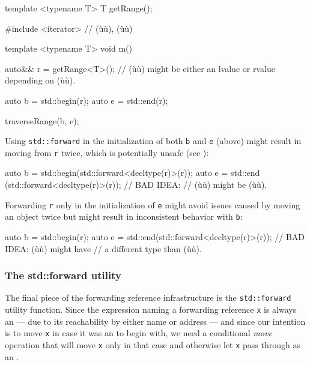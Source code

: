 \begin{emcppshiddenlisting}[emcppsbatch=e6]
template <typename T>
T getRange();
\end{emcppshiddenlisting}
\begin{emcppslisting}[emcppsbatch=e6]
#include <iterator>  // (ù{}ù), (ù{}ù)

template <typename T>
void m()
{
    auto&& r = getRange<T>();
        // (ù{}ù) might be either an lvalue or rvalue depending on (ù{}ù).

    auto b = std::begin(r);
    auto e = std::end(r);

    traverseRange(b, e);
}
\end{emcppslisting}

\noindent Using \lstinline!std::forward! in the initialization of both \lstinline!b! and
\lstinline!e! (above) might result in moving from \lstinline!r! twice, which is
potentially unsafe (see ):

\begin{emcppslisting}
auto b = std::begin(std::forward<decltype(r)>(r));
auto e = std::end  (std::forward<decltype(r)>(r));  // BAD IDEA:
                                                    // (ù{}ù) might be (ù{}ù).
\end{emcppslisting}

\noindent Forwarding
\lstinline!r! only in the initialization of \lstinline!e! might avoid issues
caused by moving an object twice but might result in inconsistent
behavior with \lstinline!b!:

\begin{emcppslisting}
auto b = std::begin(r);
auto e = std::end(std::forward<decltype(r)>(r));  // BAD IDEA: (ù{}ù) might have
                                                  // a different type than (ù{}ù).
\end{emcppslisting}

\subsubsection[The \lstinline!std::forward! utility]{The {\SubsubsecCode std::forward} utility}\label{the-std::forward-utility}

The final piece of the forwarding reference infrastructure is the
\lstinline!std::forward! utility function. Since the expression naming a
forwarding reference \lstinline!x! is always an  --- due to its
reachability by either name or address --- and since our
intention is to move \lstinline!x! in case it was an  to begin
with, we need a conditional \emph{move} operation that will move
\lstinline!x! only in that case and otherwise let \lstinline!x! pass through as
an .

